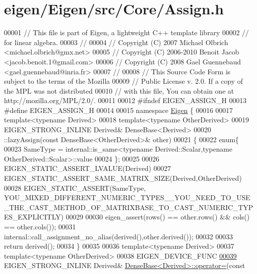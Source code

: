 \hypertarget{eigen_2_eigen_2src_2_core_2_assign_8h_source}{}\section{eigen/\+Eigen/src/\+Core/\+Assign.h}
\label{eigen_2_eigen_2src_2_core_2_assign_8h_source}

\begin{DoxyCode}
00001 \textcolor{comment}{// This file is part of Eigen, a lightweight C++ template library}
00002 \textcolor{comment}{// for linear algebra.}
00003 \textcolor{comment}{//}
00004 \textcolor{comment}{// Copyright (C) 2007 Michael Olbrich <michael.olbrich@gmx.net>}
00005 \textcolor{comment}{// Copyright (C) 2006-2010 Benoit Jacob <jacob.benoit.1@gmail.com>}
00006 \textcolor{comment}{// Copyright (C) 2008 Gael Guennebaud <gael.guennebaud@inria.fr>}
00007 \textcolor{comment}{//}
00008 \textcolor{comment}{// This Source Code Form is subject to the terms of the Mozilla}
00009 \textcolor{comment}{// Public License v. 2.0. If a copy of the MPL was not distributed}
00010 \textcolor{comment}{// with this file, You can obtain one at http://mozilla.org/MPL/2.0/.}
00011 
00012 \textcolor{preprocessor}{#ifndef EIGEN\_ASSIGN\_H}
00013 \textcolor{preprocessor}{#define EIGEN\_ASSIGN\_H}
00014 
00015 \textcolor{keyword}{namespace }\hyperlink{namespace_eigen}{Eigen} \{
00016 
00017 \textcolor{keyword}{template}<\textcolor{keyword}{typename} Derived>
00018 \textcolor{keyword}{template}<\textcolor{keyword}{typename} OtherDerived>
00019 EIGEN\_STRONG\_INLINE Derived& DenseBase<Derived>
00020   ::lazyAssign(\textcolor{keyword}{const} DenseBase<OtherDerived>& other)
00021 \{
00022   \textcolor{keyword}{enum}\{
00023     SameType = internal::is\_same<typename Derived::Scalar,typename OtherDerived::Scalar>::value
00024   \};
00025 
00026   EIGEN\_STATIC\_ASSERT\_LVALUE(Derived)
00027   EIGEN\_STATIC\_ASSERT\_SAME\_MATRIX\_SIZE(Derived,OtherDerived)
00028   EIGEN\_STATIC\_ASSERT(SameType,
      YOU\_MIXED\_DIFFERENT\_NUMERIC\_TYPES\_\_YOU\_NEED\_TO\_USE\_THE\_CAST\_METHOD\_OF\_MATRIXBASE\_TO\_CAST\_NUMERIC\_TYPES\_EXPLICITLY)
00029 
00030   eigen\_assert(rows() == other.rows() && cols() == other.cols());
00031   internal::call\_assignment\_no\_alias(derived(),other.derived());
00032   
00033   \textcolor{keywordflow}{return} derived();
00034 \}
00035 
00036 \textcolor{keyword}{template}<\textcolor{keyword}{typename} Derived>
00037 \textcolor{keyword}{template}<\textcolor{keyword}{typename} OtherDerived>
00038 EIGEN\_DEVICE\_FUNC
\hyperlink{group___core___module_a581a7a353bd007b5352f11688e3bc5fa}{00039} EIGEN\_STRONG\_INLINE Derived& \hyperlink{group___core___module_a581a7a353bd007b5352f11688e3bc5fa}{DenseBase<Derived>::operator=}(\textcolor{keyword}{const} 

\end{DoxyCode}
